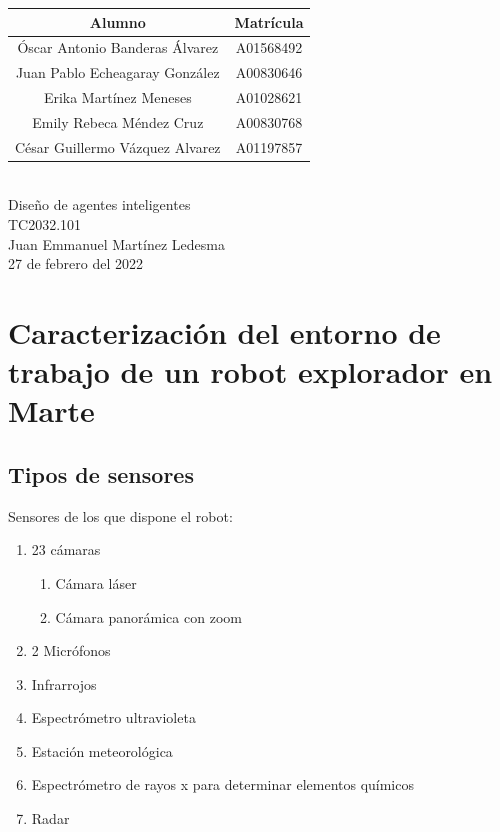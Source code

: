 \documentclass{article}
\begin{document}
\begin{titlepage}
\begin{center}
        \begin{tabular}{|| c | c ||}
            \hline
            Alumno & Matrícula \\
            \hline
            Óscar Antonio Banderas Álvarez  & A01568492 \\
            \hline
            Juan Pablo Echeagaray González & A00830646 \\
            \hline
            Erika Martínez Meneses & A01028621 \\
            \hline
            Emily Rebeca Méndez Cruz & A00830768 \\
            \hline
            César Guillermo Vázquez Alvarez & A01197857 \\
            \hline
        \end{tabular} \\
        \vspace{0.7cm}
        Diseño de agentes inteligentes\\ %
        \vspace{0.2cm}
        TC2032.101\\ %
        \vspace{0.2cm}
        Juan Emmanuel Martínez Ledesma \\ %
        \vspace{0.7cm}
        27 de febrero del 2022 \\ %
        \end{center}
    \end{titlepage}

    \section{Caracterización del entorno de trabajo de un robot explorador en Marte}
        \subsection{Tipos de sensores}
        Sensores de los que dispone el robot:
            \begin{enumerate}
                \item 23 cámaras
                \begin{enumerate}
                    \item Cámara láser
                    \item Cámara panorámica con zoom
                \end{enumerate}
                \item 2 Micrófonos
                \item Infrarrojos
                \item Espectrómetro ultravioleta
                \item Estación meteorológica
                \item Espectrómetro de rayos x para determinar elementos químicos
                \item Radar
            \end{enumerate}
\end{document}

